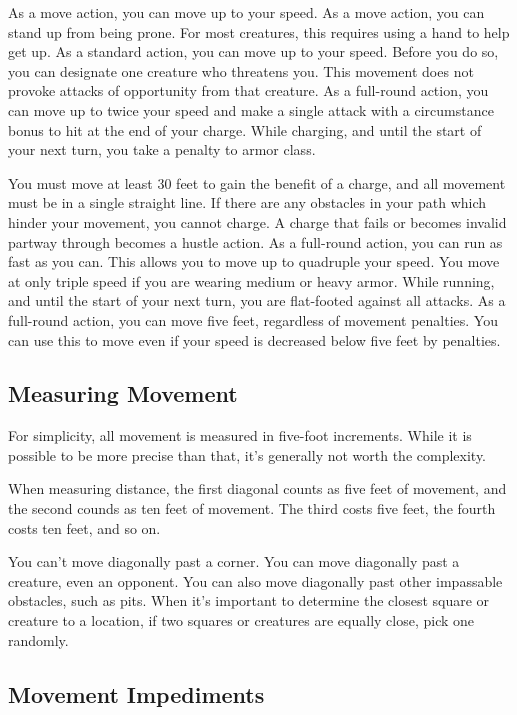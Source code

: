  As a move action, you can move up to your speed.
 As a move action, you can stand up from being prone. For most creatures, this requires using a hand to help get up.
\label{Withdraw} As a standard action, you can move up to your speed. Before you do so, you can designate one creature who threatens you. This movement does not provoke attacks of opportunity from that creature.
\label{Charge} As a full-round action, you can move up to twice your speed and make a single attack with a  circumstance bonus to hit at the end of your charge. While charging, and until the start of your next turn, you take a  penalty to armor class.
\par You must move at least 30 feet to gain the benefit of a charge, and all movement must be in a single straight line. If there are any obstacles in your path which hinder your movement, you cannot charge. A charge that fails or becomes invalid partway through becomes a hustle action.
 As a full-round action, you can run as fast as you can. This allows you to move up to quadruple your speed. You move at only triple speed if you are wearing medium or heavy armor. While running, and until the start of your next turn, you are flat-footed against all attacks.
 As a full-round action, you can move five feet, regardless of movement penalties. You can use this to move even if your speed is decreased below five feet by penalties.

\subsection{Measuring Movement}
For simplicity, all movement is measured in five-foot increments. While it is possible to be more precise than that, it's generally not worth the complexity.

 When measuring distance, the first diagonal counts as five feet of movement, and the second counds as ten feet of movement. The third costs five feet, the fourth costs ten feet, and so on.

You can't move diagonally past a corner. You can move diagonally past a creature, even an opponent. You can also move diagonally past other impassable obstacles, such as pits.
 When it's important to determine the closest square or creature to a location, if two squares or creatures are equally close, pick one randomly.

\subsection{Movement Impediments}

